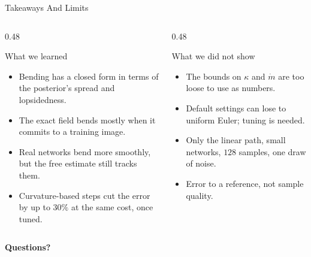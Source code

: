 \documentclass[aspectratio=169]{beamer}
\begin{document}
	\begin{frame}{Takeaways And Limits}
		\begin{columns}[onlytextwidth, T]
			\begin{column}{0.48\textwidth}
				\begin{block}{What we learned}
					\footnotesize
					\begin{minipage}[t][4.0cm][t]{\linewidth}
						\begin{itemize}
							\item Bending has a closed form in terms of the posterior's spread and lopsidedness.
							\item The exact field bends mostly when it commits to a training image.
							\item Real networks bend more smoothly, but the free estimate still tracks them.
							\item Curvature-based steps cut the error by up to $30\%$ at the same cost, once tuned.
						\end{itemize}
					\end{minipage}
				\end{block}
			\end{column}
			\begin{column}{0.48\textwidth}
				\begin{block}{What we did not show}
					\footnotesize
					\begin{minipage}[t][4.0cm][t]{\linewidth}
						\begin{itemize}
							\item The bounds on $\kappa$ and $\dot m$ are too loose to use as numbers.
							\item Default settings can lose to uniform Euler; tuning is needed.
							\item Only the linear path, small networks, $128$ samples, one draw of noise.
							\item Error to a reference, not sample quality.
						\end{itemize}
					\end{minipage}
				\end{block}
			\end{column}
		\end{columns}
	\end{frame}

	\begin{frame}[plain]
		\centering
		\vfill
		{\fontsize{40}{48}\selectfont\textcolor{coolpurple}{\textbf{Questions?}}}
		\vfill
	\end{frame}
\end{document}
